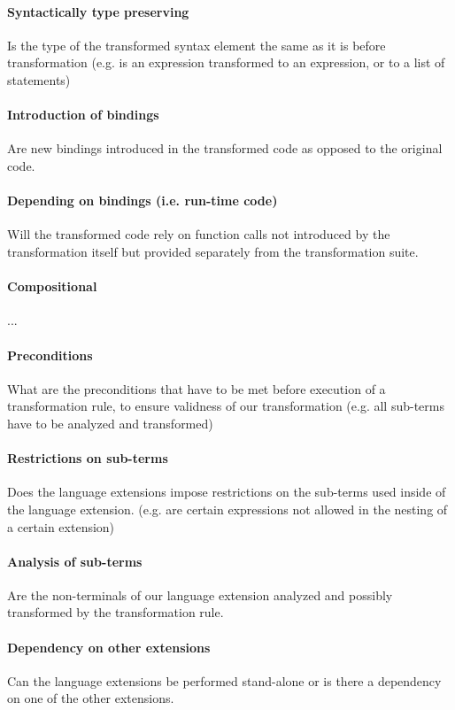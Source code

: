 \documentclass[10pt,a4paper]{article}
\begin{document}
\paragraph{Syntactically type preserving}
Is the type of the transformed syntax element the same as it is before transformation (e.g. is an expression transformed to an expression, or to a list of statements)

\paragraph{Introduction of bindings}
Are new bindings introduced in the transformed code as opposed to the original code.

\paragraph{Depending on bindings (i.e. run-time code)}
Will the transformed code rely on function calls not introduced by the transformation itself but provided separately from the transformation suite.

\paragraph{Compositional}
...

\paragraph{Preconditions}
What are the preconditions that have to be met before execution of a transformation rule, to ensure validness of our transformation (e.g. all sub-terms have to be analyzed and transformed)

\paragraph{Restrictions on sub-terms}
Does the language extensions impose restrictions on the sub-terms used inside of the language extension. (e.g. are certain expressions not allowed in the nesting of a certain extension)

\paragraph{Analysis of sub-terms}
Are the non-terminals of our language extension analyzed and possibly transformed by the transformation rule.

\paragraph{Dependency on other extensions}
Can the language extensions be performed stand-alone or is there a dependency on one of the other extensions.
\end{document}
